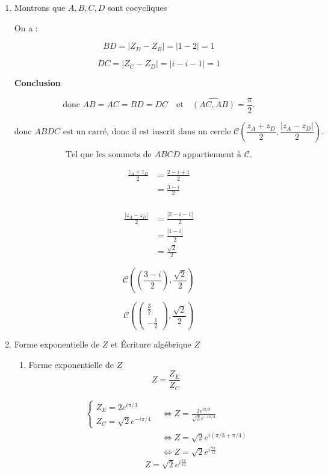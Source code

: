 \documentclass[12pt,a4paper]{article}
\begin{document}
\begin{enumerate}
\item Montrons que $A, B, C, D$ sont cocycliques

On a :

\[
BD = |Z_D - Z_B| = |1 - 2| = 1
\]

\[
DC = |Z_C - Z_D| = |i - i - 1| = 1
\]

\textbf{Conclusion} 

\[
\text{donc } AB = AC = BD = DC \quad \text{et} \quad \widehat{(AC, AB)} = \frac{\pi}{2}.
\]

\[
\text{donc } ABDC \text{ est un carré, donc il est inscrit dans un cercle } \mathcal{C}\left(\frac{z_{A}+z_{D}}{2},\frac{|z_{A}-z_{D}|}{2} \right) .
\]

\[
\text{Tel que les sommets de } ABCD \text{ appartiennent à } \mathcal{C}.
\]

\begin{align*}
\frac{z_{A}+z_{D}}{2}&=\frac{2-i+1}{2}\\
					 &=\frac{3-i}{2}\\
\end{align*}

\begin{align*}
\frac{|z_{A}-z_{D}|}{2}&=\frac{|2-i-1|}{2}\\
						&=\frac{|1-i|}{2}\\
						&=\frac{\sqrt{2}}{2}
\end{align*}

$$ \boxed{\mathcal{C}\left( \left( \frac{3-i}{2} \right) , \frac{\sqrt{2}}{2} \right)} $$

$$ \boxed{\mathcal{C} \left( \begin{pmatrix} \frac{3}{2} \\ -\frac{1}{2} \end{pmatrix}, \frac{\sqrt{2}}{2} \right)} $$
\item Forme exponentielle de $Z$ et Écriture algébrique $Z$

\begin{enumerate}
\item Forme exponentielle de $Z$
\[
Z = \frac{Z_E}{Z_C}
\]


\begin{align*}
\begin{cases}
Z_E = 2 e^{i\pi/3}\\
Z_C = \sqrt{2} e^{-i\pi/4}
\end{cases}
&\iff Z = \frac{2 e^{i\pi/3}}{\sqrt{2} e^{-i\pi/4}}\\
&\iff Z = \sqrt{2} e^{i(\pi/3 + \pi/4)}\\
&\iff Z = \sqrt{2} e^{i\frac{7\pi}{12}}
\end{align*}
\[
\boxed{Z = \sqrt{2} e^{i\frac{7\pi}{12}}}
\]


\end{enumerate}
\end{enumerate}
\end{document}
